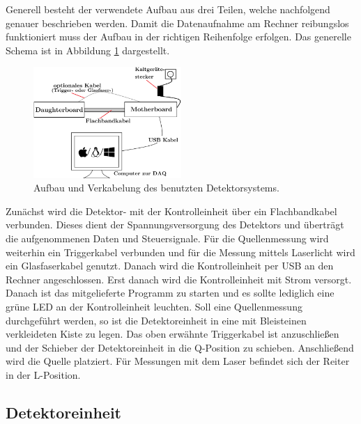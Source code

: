Generell besteht der verwendete Aufbau aus drei Teilen, welche nachfolgend genauer beschrieben werden.
Damit die Datenaufnahme am Rechner reibungslos funktioniert muss der Aufbau in der richtigen Reihenfolge erfolgen.
Das generelle Schema ist in Abbildung \ref{fig:aufbau} dargestellt.

\begin{figure}[H]
  \centering
  \includegraphics[width=0.5\textwidth]{content/graphics/aufbau.png}
  \caption{Aufbau und Verkabelung des benutzten Detektorsystems.}
  \label{fig:aufbau}
\end{figure}

Zunächst wird die Detektor- mit der Kontrolleinheit über ein Flachbandkabel verbunden.
Dieses dient der Spannungsversorgung des Detektors und überträgt die aufgenommenen Daten und Steuersignale.
Für die Quellenmessung wird weiterhin ein Triggerkabel verbunden und für die Messung mittels Laserlicht wird ein Glasfaserkabel genutzt.
Danach wird die Kontrolleinheit per USB an den Rechner angeschlossen.
Erst danach wird die Kontrolleinheit mit Strom versorgt.
Danach ist das mitgelieferte Programm zu starten und es sollte lediglich eine grüne LED an der Kontrolleinheit leuchten.
Soll eine Quellenmessung durchgeführt werden, so ist die Detektoreinheit in eine mit Bleisteinen verkleideten Kiste zu legen.
Das oben erwähnte Triggerkabel ist anzuschließen und der Schieber der Detektoreinheit in die Q-Position zu schieben.
Anschließend wird die Quelle platziert.
Für Messungen mit dem Laser befindet sich der Reiter in der L-Position.

\subsection{Detektoreinheit}

